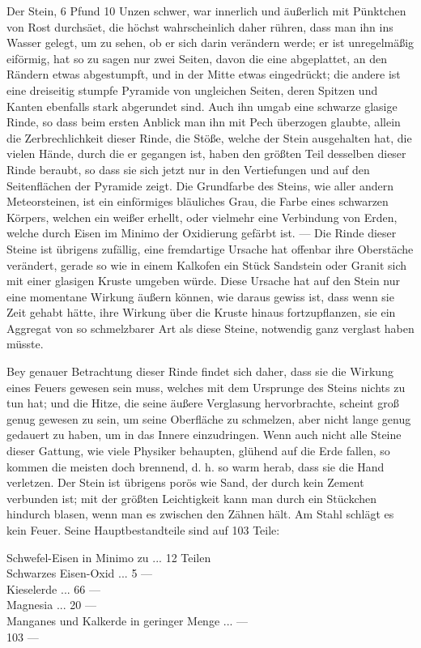 \documentclass[a4paper, 11pt, oneside, polutonikogreek, german]{article}
\begin{document}
Der Stein, 6 Pfund 10 Unzen schwer, war innerlich und äußerlich mit Pünktchen von Rost durchsäet, die höchst wahrscheinlich daher rühren, dass man ihn ins Wasser gelegt, um zu sehen, ob er sich darin verändern werde; er ist unregelmäßig eiförmig, hat so zu sagen nur zwei Seiten, davon die eine abgeplattet, an den Rändern etwas abgestumpft, und in der Mitte etwas eingedrückt; die andere ist eine dreiseitig stumpfe Pyramide von ungleichen Seiten, deren Spitzen und Kanten ebenfalls stark abgerundet sind. Auch ihn umgab eine schwarze glasige Rinde, so dass beim ersten Anblick man ihn mit Pech überzogen glaubte, allein die Zerbrechlichkeit dieser Rinde, die Stöße, welche der Stein ausgehalten hat, die vielen Hände, durch die er gegangen ist, haben den größten Teil desselben dieser Rinde beraubt, so dass sie sich jetzt nur in den Vertiefungen und auf den Seitenflächen der Pyramide zeigt. Die Grundfarbe des Steins, wie aller andern Meteorsteinen, ist ein einförmiges bläuliches Grau, die Farbe eines schwarzen Körpers, welchen ein weißer erhellt, oder vielmehr eine Verbindung von Erden, welche durch Eisen im Minimo der Oxidierung gefärbt ist. --- Die Rinde dieser Steine ist übrigens zufällig, eine fremdartige Ursache hat offenbar ihre Oberstäche verändert, gerade so wie in einem Kalkofen ein Stück Sandstein oder Granit sich mit einer glasigen Kruste umgeben würde. Diese Ursache hat auf den Stein nur eine momentane Wirkung äußern können, wie daraus gewiss ist, dass wenn sie Zeit gehabt hätte, ihre Wirkung über die Kruste hinaus fortzupflanzen, sie ein Aggregat von so schmelzbarer Art als diese Steine, notwendig ganz verglast haben müsste.

Bey genauer Betrachtung dieser Rinde findet sich daher, dass sie die Wirkung eines Feuers gewesen sein muss, welches mit dem Ursprunge des Steins nichts zu tun hat; und die Hitze, die seine äußere Verglasung hervorbrachte, scheint groß genug gewesen zu sein, um seine Oberfläche zu schmelzen, aber nicht lange genug gedauert zu haben, um in das Innere einzudringen. Wenn auch nicht alle Steine dieser Gattung, wie viele Physiker behaupten, glühend auf die Erde fallen, so kommen die meisten doch brennend, d. h. so warm herab, dass sie die Hand verletzen. Der Stein ist übrigens porös wie Sand, der durch kein Zement verbunden ist; mit der größten Leichtigkeit kann man durch ein Stückchen hindurch blasen, wenn man es zwischen den Zähnen hält. Am Stahl schlägt es kein Feuer. Seine Hauptbestandteile sind auf 103 Teile:

Schwefel-Eisen in Minimo zu ... 12 Teilen\\
\hspace*{0.5cm} Schwarzes Eisen-Oxid ... 5 ---\\
\hspace*{0.5cm} Kieselerde ... 66 ---\\
\hspace*{0.5cm} Magnesia ... 20 ---\\
\hspace*{0.5cm} Manganes und Kalkerde in geringer Menge ... ---\\
\hspace*{2.5cm} 103 ---
\end{document}
